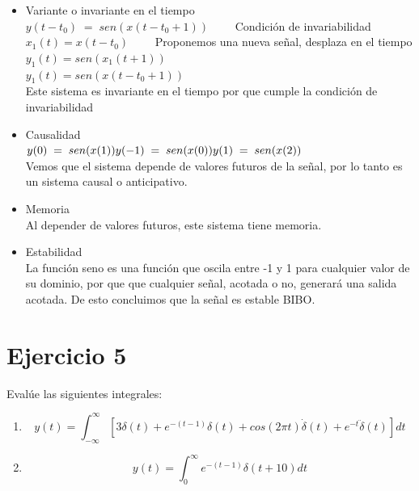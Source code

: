 \documentclass[10pt,a4paper]{report}
\begin{document}
\begin{enumerate}
\begin{itemize}
  \item Variante o invariante en el tiempo\\
$ y(t-t_0)\;=\;sen(x(t-t_0+1)) \qquad $ Condición de invariabilidad\\
$ x_1(t)=x(t-t_0) \qquad $ Proponemos una nueva señal, desplaza en el tiempo \\ 
$ y_1(t)=sen(x_1(t+1)) $\\
$ y_1(t)=sen(x(t-t_0+1)) $\\
  \newline  
  Este sistema es invariante en el tiempo por que cumple la condición de invariabilidad\\
  \newline
  \item Causalidad\\
$y(0)\;=\;sen(x(1))\\
y(-1)\;=\;sen(x(0))\\
y(1)\;=\;sen(x(2))$\\
  \newline
Vemos que el sistema depende de valores futuros de la señal, por lo tanto es un sistema causal o anticipativo.\\

  \item Memoria\\
Al depender de valores futuros, este sistema tiene memoria.\\

  \item Estabilidad\\
La función seno es una función que oscila entre -1 y 1 para cualquier valor de su dominio, por que que cualquier señal, acotada o no, generará una salida acotada. De esto concluimos que la señal es estable BIBO.
  \end{itemize}
\end{enumerate}

\section{Ejercicio 5}

Evalúe las siguientes integrales:
\begin{enumerate}
  \item \[ y(t)=\int_{-\infty }^{\infty }[3\delta (t)+e^{-(t-1)}\delta (t)+cos(2\pi t)\dot{\delta}(t)+e^{-t}\ddot{\delta}(t)]dt \]

  \item \[ y(t)=\int_{0}^{\infty }e^{-(t-1)}\delta (t+10)dt \]

\end{enumerate}
\end{document}
